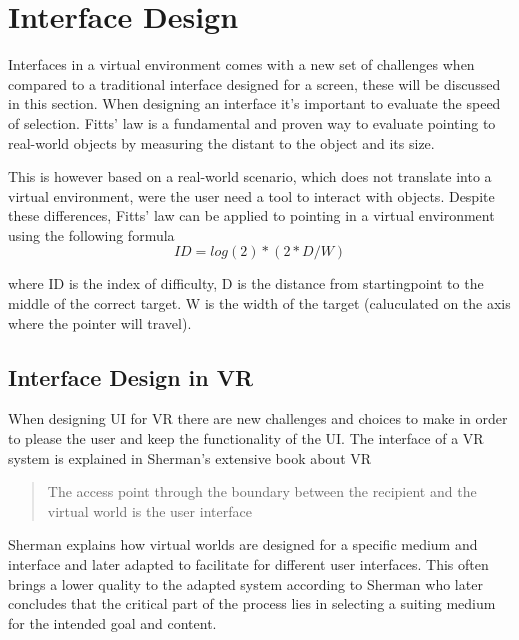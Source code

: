 \section{Interface Design}
Interfaces in a virtual environment comes with a new set of challenges when compared to a traditional interface designed for a screen, these will be discussed in this section.
When designing an interface it's important to evaluate the speed of selection. Fitts' law is a fundamental and proven way to evaluate pointing to real-world objects by measuring the distant to the object and its size\cite{interface:Fitts1954}.

This is however based on a real-world scenario, which does not translate into a virtual environment, were the user need a tool to interact with objects. Despite these differences, Fitts' law can be applied to pointing in a virtual environment using the following formula  \cite{interface:card1978evaluation}
\begin{equation}
ID = log(2) * ( 2 * D / W )
\end{equation}

where ID is the index of difficulty, D is the distance from startingpoint to the middle of the correct target. W is the width of the target (caluculated  on the axis where the pointer will travel).

\subsection{Interface Design in VR}
When designing UI for VR there are new challenges and choices to make in order to please the user and keep the functionality of the UI. The interface of a VR system is explained in Sherman's extensive book about VR\cite{interface:sherman2002understanding}
 \begin{quote}
   The access point through the boundary between the recipient and the virtual world is the user interface
 \end{quote}
 Sherman explains how virtual worlds are designed for a specific medium and interface and later adapted to facilitate for different user interfaces. This often brings a lower quality to the adapted system according to Sherman who later concludes that the critical part of the process lies in selecting a suiting medium for the intended goal and content\cite{interface:sherman2002understanding}.

